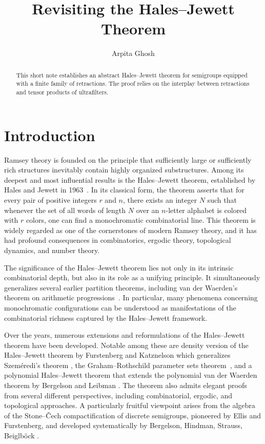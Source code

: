 \documentclass[12pt]{amsart}
\title{Revisiting the Hales--Jewett Theorem }
\author{Arpita Ghosh}
\date{}
\begin{document}
\begin{abstract}
This short note establishes an abstract Hales--Jewett theorem for semigroups equipped with a finite family of retractions. The proof relies on the interplay between retractions and tensor products of ultrafilters.
\end{abstract}

\maketitle

\section{Introduction}

Ramsey theory is founded on the principle that sufficiently large or sufficiently rich structures inevitably contain highly organized substructures. Among its deepest and most influential results is the Hales--Jewett theorem, established by Hales and Jewett in 1963~\cite{HalesJewett}. In its classical form, the theorem asserts that for every pair of positive integers $r$ and $n$, there exists an integer $N$ such that whenever the set of all words of length $N$ over an $n$-letter alphabet is colored with $r$ colors, one can find a monochromatic combinatorial line. This theorem is widely regarded as one of the cornerstones of modern Ramsey theory, and it has had profound consequences in combinatorics, ergodic theory, topological dynamics, and number theory.

The significance of the Hales--Jewett theorem lies not only in its intrinsic combinatorial depth, but also in its role as a unifying principle. It simultaneously generalizes several earlier partition theorems, including van der Waerden's theorem on arithmetic progressions~\cite{vdW}. In particular, many phenomena concerning monochromatic configurations can be understood as manifestations of the combinatorial richness captured by the Hales--Jewett framework.

Over the years, numerous extensions and reformulations of the Hales--Jewett theorem have been developed. Notable among these are density
version of the Hales–Jewett theorem by Furstenberg and Katznelson \cite{FurstenbergKatznelson} which generalizes Szem\'{e}redi’s theorem \cite{Szeme}, the Graham--Rothschild parameter sets theorem~\cite{GrahamRothschild}, and a polynomial Hales–Jewett theorem that extends the polynomial van
der Waerden theorem by Bergelson and Leibman \cite{BerLeib}. The theorem also admits elegant proofs from several different perspectives, including combinatorial, ergodic, and topological approaches. A particularly fruitful viewpoint arises from the algebra of the Stone--\v{C}ech compactification of discrete semigroups, pioneered by Ellis and Furstenberg, and developed systematically by Bergelson, Hindman, Strauss, Beiglb\"{o}ck \cite{Bergelson1986,HindmanStrauss,Beiglbock}.
\end{document}
